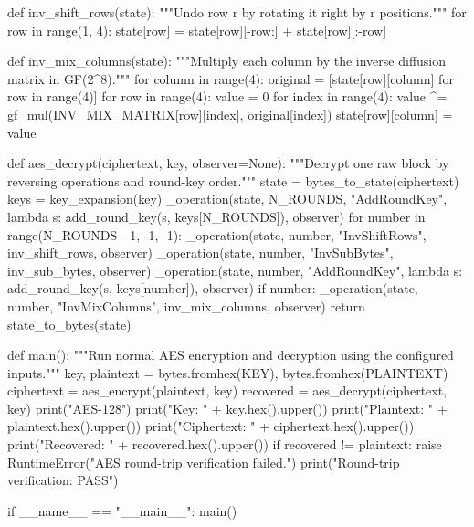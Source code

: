 \begin{lightcode}[numbers=left,firstnumber=1]
def inv_shift_rows(state):
    """Undo row r by rotating it right by r positions."""
    for row in range(1, 4):
        state[row] = state[row][-row:] + state[row][:-row]


def inv_mix_columns(state):
    """Multiply each column by the inverse diffusion matrix in GF(2^8)."""
    for column in range(4):
        original = [state[row][column] for row in range(4)]
        for row in range(4):
            value = 0
            for index in range(4):
                value ^= gf_mul(INV_MIX_MATRIX[row][index], original[index])
            state[row][column] = value


def aes_decrypt(ciphertext, key, observer=None):
    """Decrypt one raw block by reversing operations and round-key order."""
    state = bytes_to_state(ciphertext)
    keys = key_expansion(key)
    _operation(state, N_ROUNDS, "AddRoundKey", lambda s: add_round_key(s, keys[N_ROUNDS]), observer)
    for number in range(N_ROUNDS - 1, -1, -1):
        _operation(state, number, "InvShiftRows", inv_shift_rows, observer)
        _operation(state, number, "InvSubBytes", inv_sub_bytes, observer)
        _operation(state, number, "AddRoundKey", lambda s: add_round_key(s, keys[number]), observer)
        if number:
            _operation(state, number, "InvMixColumns", inv_mix_columns, observer)
    return state_to_bytes(state)


def main():
    """Run normal AES encryption and decryption using the configured inputs."""
    key, plaintext = bytes.fromhex(KEY), bytes.fromhex(PLAINTEXT)
    ciphertext = aes_encrypt(plaintext, key)
    recovered = aes_decrypt(ciphertext, key)
    print("AES-128")
    print("Key:        " + key.hex().upper())
    print("Plaintext:  " + plaintext.hex().upper())
    print("Ciphertext: " + ciphertext.hex().upper())
    print("Recovered:  " + recovered.hex().upper())
    if recovered != plaintext:
        raise RuntimeError("AES round-trip verification failed.")
    print("Round-trip verification: PASS")


if __name__ == "__main__":
    main()
\end{lightcode}
